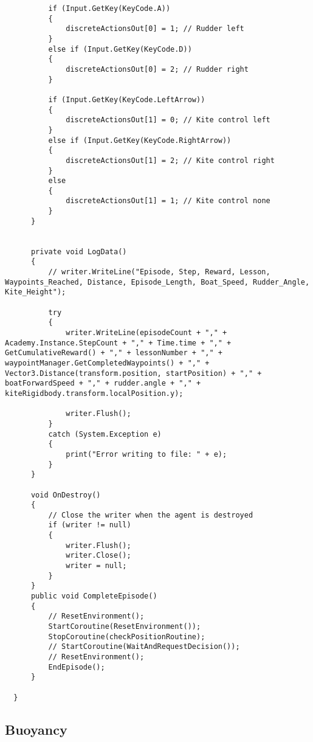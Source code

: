 \begin{lstlisting}
          if (Input.GetKey(KeyCode.A))
          {
              discreteActionsOut[0] = 1; // Rudder left
          }
          else if (Input.GetKey(KeyCode.D))
          {
              discreteActionsOut[0] = 2; // Rudder right
          }
  
          if (Input.GetKey(KeyCode.LeftArrow))
          {
              discreteActionsOut[1] = 0; // Kite control left
          }
          else if (Input.GetKey(KeyCode.RightArrow))
          {
              discreteActionsOut[1] = 2; // Kite control right
          }
          else
          {
              discreteActionsOut[1] = 1; // Kite control none
          }
      }
  
  
      private void LogData()
      {
          // writer.WriteLine("Episode, Step, Reward, Lesson, Waypoints_Reached, Distance, Episode_Length, Boat_Speed, Rudder_Angle, Kite_Height");
  
          try
          {
              writer.WriteLine(episodeCount + "," + Academy.Instance.StepCount + "," + Time.time + "," + GetCumulativeReward() + "," + lessonNumber + "," + waypointManager.GetCompletedWaypoints() + "," + Vector3.Distance(transform.position, startPosition) + "," + boatForwardSpeed + "," + rudder.angle + "," + kiteRigidbody.transform.localPosition.y);
  
              writer.Flush();
          }
          catch (System.Exception e)
          {
              print("Error writing to file: " + e);
          }
      }
  
      void OnDestroy()
      {
          // Close the writer when the agent is destroyed
          if (writer != null)
          {
              writer.Flush();
              writer.Close();
              writer = null;
          }
      }
      public void CompleteEpisode()
      {
          // ResetEnvironment();
          StartCoroutine(ResetEnvironment());
          StopCoroutine(checkPositionRoutine);
          // StartCoroutine(WaitAndRequestDecision());
          // ResetEnvironment();
          EndEpisode();
      }
  
  }
\end{lstlisting}

\subsection{Buoyancy}\label{sec:buoyancy}

